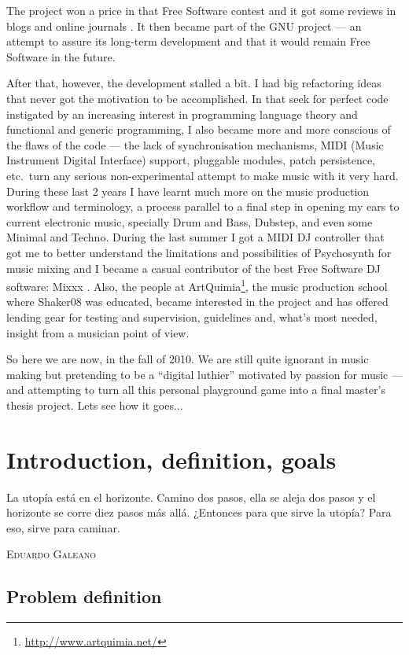 The project won a price in that Free Software contest and it got some
reviews in blogs and online journals \cite{dave08synths,
  kirin08psychosynth}. It then became part of the GNU project --- an
attempt to assure its long-term development and that it would remain
Free Software in the future.

After that, however, the development stalled a bit. I had big
refactoring ideas that never got the motivation to be accomplished. In
that seek for perfect code instigated by an increasing interest in
programming language theory and functional and generic programming, I
also became more and more conscious of the flaws of the code --- the
lack of synchronisation mechanisms, MIDI (Music Instrument Digital
Interface) support, pluggable modules, patch persistence, etc.\ turn
any serious non-experimental attempt to make music with it very
hard. During these last 2 years I have learnt much more on the music
production workflow and terminology, a process parallel to a final
step in opening my ears to current electronic music, specially Drum
and Bass, Dubstep, and even some Minimal and Techno. During the last
summer I got a MIDI DJ controller that got me to better understand the
limitations and possibilities of Psychosynth for music mixing and I
became a casual contributor of the best Free Software DJ software:
Mixxx \cite{andersen03mixxx}. Also, the people at
ArtQuimia\footnote{\url{http://www.artquimia.net/}}, the music
production school where Shaker08 was educated, became interested in
the project and has offered lending gear for testing and supervision,
guidelines and, what's most needed, insight from a musician point of
view.

So here we are now, in the fall of 2010. We are still quite ignorant
in music making but pretending to be a ``digital luthier'' motivated
by passion for music --- and attempting to turn all this personal
playground game into a final master's thesis project. Lets see how it
goes...

\chapter{Introduction, definition, goals}

\epigraph{La utopía está en el horizonte. Camino dos pasos, ella se
  aleja dos pasos y el horizonte se corre diez pasos más
  allá. ¿Entonces para que sirve la utopía? Para eso, sirve para
  caminar.}{\textsc{Eduardo Galeano}}

\section{Problem definition}

